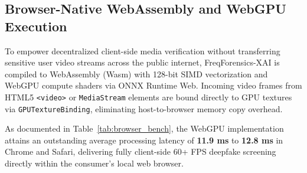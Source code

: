 \documentclass[journal]{IEEEtran}
\begin{document}
\subsection{Browser-Native WebAssembly and WebGPU Execution}
To empower decentralized client-side media verification without transferring sensitive user video streams across the public internet, FreqForensics-XAI is compiled to WebAssembly (Wasm) with 128-bit SIMD vectorization and WebGPU compute shaders via ONNX Runtime Web. Incoming video frames from HTML5 \texttt{<video>} or \texttt{MediaStream} elements are bound directly to GPU textures via \texttt{GPUTextureBinding}, eliminating host-to-browser memory copy overhead.

\begin{table}[!t]
\caption{In-Browser Client-Side Forensic Telemetry Across Modern Web Browsers}
\label{tab:browser_bench}
\centering
{}
\end{table}

As documented in Table~\ref{tab:browser_bench}, the WebGPU implementation attains an outstanding average processing latency of \textbf{11.9 ms} to \textbf{12.8 ms} in Chrome and Safari, delivering fully client-side 60+ FPS deepfake screening directly within the consumer's local web browser.
\end{document}
